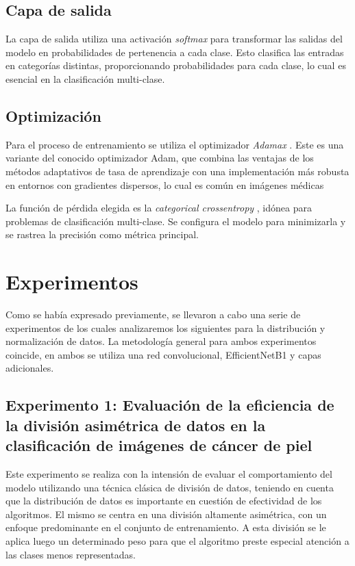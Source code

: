    \subsection{Capa de salida}
   
   La capa de salida utiliza una activación \textit{softmax} para transformar las salidas del modelo en probabilidades de pertenencia a cada clase. Esto clasifica las entradas en categorías distintas, proporcionando probabilidades para cada clase, lo cual es esencial en la clasificación multi-clase.
   
   \subsection{Optimización}
   
   Para el proceso de entrenamiento se utiliza el optimizador \textit{Adamax} . Este es una variante del conocido optimizador Adam, que combina las ventajas de los métodos adaptativos de tasa de aprendizaje con una implementación más robusta en entornos con gradientes dispersos, lo cual es común en imágenes médicas 
   
   La función de pérdida elegida es la \textit{categorical crossentropy} , idónea para problemas de clasificación multi-clase. Se configura el modelo para minimizarla y se rastrea la precisión como métrica principal.

\section{Experimentos}

Como se había expresado previamente, se llevaron a cabo una serie de experimentos de los cuales analizaremos los siguientes para la distribución y normalización de datos. La metodología general para ambos experimentos coincide, en ambos se utiliza una red convolucional, EfficientNetB1 y capas adicionales.

\subsection{Experimento 1: Evaluación de la eficiencia de la división asimétrica de datos en la clasificación de imágenes de cáncer de piel}

Este experimento se realiza con la intensión de evaluar el comportamiento del modelo utilizando una técnica clásica de división de datos, teniendo en cuenta que la distribución de datos es importante en cuestión de efectividad de los algoritmos. El mismo se centra en una división altamente asimétrica, con un enfoque predominante en el conjunto de entrenamiento. A esta división se le aplica luego un determinado peso para que el algoritmo preste especial atención a las clases menos representadas. 

